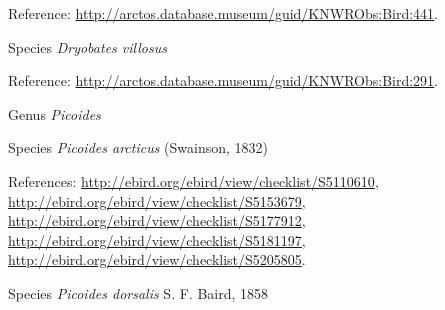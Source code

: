 \documentclass[9pt, article]{memoir}
\begin{document}
\begin{multicols}{2}
\vspace{6pt}Reference: 
\url{http://arctos.database.museum/guid/KNWRObs:Bird:441}.

\vspace{6pt}\noindent\hspace{36pt}Species \textit{Dryobates villosus}


\vspace{6pt}Reference: 
\url{http://arctos.database.museum/guid/KNWRObs:Bird:291}.

\vspace{6pt}\noindent\hspace{30pt}Genus \textit{Picoides}


\vspace{6pt}\noindent\hspace{36pt}Species \textit{Picoides arcticus} (Swainson, 1832)


\vspace{6pt}References: 
\url{http://ebird.org/ebird/view/checklist/S5110610}, 
\url{http://ebird.org/ebird/view/checklist/S5153679}, 
\url{http://ebird.org/ebird/view/checklist/S5177912}, 
\url{http://ebird.org/ebird/view/checklist/S5181197}, 
\url{http://ebird.org/ebird/view/checklist/S5205805}.

\vspace{6pt}\noindent\hspace{36pt}Species \textit{Picoides dorsalis} S. F. Baird, 1858



\end{multicols}
\end{document}
